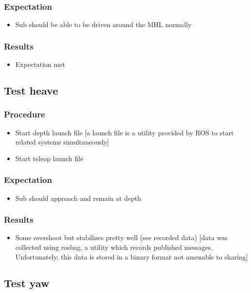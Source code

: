 \documentclass[conference]{IEEEtran}
\begin{document}
\subsubsection{Expectation}
\begin{itemize}
    \item Sub should be able to be driven around the MHL normally
\end{itemize}
\subsubsection{Results}
\begin{itemize}
    \item Expectation met
\end{itemize}

\subsection{Test heave}
\subsubsection{Procedure}
\begin{itemize}
    \item Start depth launch file [a launch file is a utility provided by ROS to start related systems simultaneously]
    \item Start teleop launch file
\end{itemize}
\subsubsection{Expectation}
\begin{itemize}
    \item Sub should approach and remain at depth
\end{itemize}
\subsubsection{Results}
\begin{itemize}
    \item Some overshoot but stabilizes pretty well (see recorded data) [data was collected using rosbag, a utility which records published messages. Unfortunately, this data is stored in a binary format not amenable to sharing]
\end{itemize}

\subsection{Test yaw}
\end{document}
